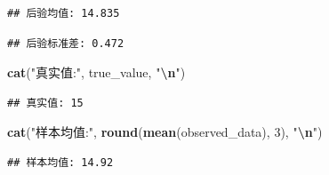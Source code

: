 \documentclass[
  twoside]{book}
\newenvironment{Shaded}{\begin{snugshade}}{\end{snugshade}}
\newcommand{\CommentTok}[1]{\textcolor[rgb]{0.56,0.35,0.01}{\textit{#1}}}
\newcommand{\DecValTok}[1]{\textcolor[rgb]{0.00,0.00,0.81}{#1}}
\newcommand{\FloatTok}[1]{\textcolor[rgb]{0.00,0.00,0.81}{#1}}
\newcommand{\FunctionTok}[1]{\textcolor[rgb]{0.13,0.29,0.53}{\textbf{#1}}}
\newcommand{\NormalTok}[1]{#1}
\newcommand{\OtherTok}[1]{\textcolor[rgb]{0.56,0.35,0.01}{#1}}
\newcommand{\SpecialCharTok}[1]{\textcolor[rgb]{0.81,0.36,0.00}{\textbf{#1}}}
\newcommand{\StringTok}[1]{\textcolor[rgb]{0.31,0.60,0.02}{#1}}
\begin{document}
\begin{verbatim}
## 后验均值: 14.835
\end{verbatim}

\begin{Shaded}
\end{Shaded}

\begin{verbatim}
## 后验标准差: 0.472
\end{verbatim}

\begin{Shaded}
\begin{Highlighting}[]
\FunctionTok{cat}\NormalTok{(}\StringTok{"真实值:"}\NormalTok{, true\_value, }\StringTok{"}\SpecialCharTok{\textbackslash{}n}\StringTok{"}\NormalTok{)}
\end{Highlighting}
\end{Shaded}

\begin{verbatim}
## 真实值: 15
\end{verbatim}

\begin{Shaded}
\begin{Highlighting}[]
\FunctionTok{cat}\NormalTok{(}\StringTok{"样本均值:"}\NormalTok{, }\FunctionTok{round}\NormalTok{(}\FunctionTok{mean}\NormalTok{(observed\_data), }\DecValTok{3}\NormalTok{), }\StringTok{"}\SpecialCharTok{\textbackslash{}n}\StringTok{"}\NormalTok{)}
\end{Highlighting}
\end{Shaded}

\begin{verbatim}
## 样本均值: 14.92
\end{verbatim}

\begin{Shaded}
\end{Shaded}
\end{document}
